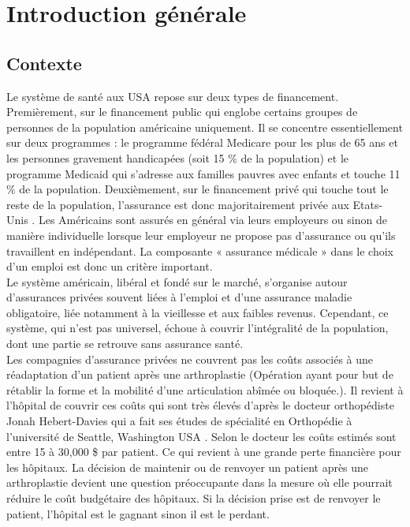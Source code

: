 \documentclass[12pt, french]{report}
\begin{document}
\newpage
\chapter{Introduction générale}	
\section{Contexte}
Le système de santé aux USA repose sur deux types de financement. Premièrement, sur le financement public qui englobe certains groupes de personnes de la population américaine uniquement. Il se concentre 	essentiellement sur deux programmes : le programme 		fédéral Medicare pour les plus de 65 ans et les personnes gravement handicapées (soit 15 \% de la population) et le programme Medicaid qui 			s’adresse aux familles pauvres avec enfants et touche 11 \% de la population. Deuxièmement, sur le financement privé qui touche tout le reste de la population, l’assurance est donc majoritairement privée aux 		Etats-Unis \cite{key4}. Les Américains sont assurés en général via leurs employeurs ou sinon de manière individuelle lorsque leur employeur ne propose pas d’assurance ou qu’ils travaillent en indépendant. La composante « 	assurance médicale » dans le choix d’un emploi est donc un critère important.\\
	
Le système américain, libéral et fondé sur le marché, s’organise autour d’assurances privées souvent liées à l’emploi et d’une assurance maladie obligatoire, liée notamment à la vieillesse et aux faibles revenus.
Cependant, ce système, qui n’est pas universel, échoue à couvrir l’intégralité de la population, dont une partie se retrouve sans assurance santé. \cite{key9} \\

Les compagnies d'assurance privées ne couvrent pas les coûts associés à une réadaptation d'un patient après une arthroplastie (Opération ayant pour but de rétablir la forme et la mobilité d'une articulation abîmée ou bloquée.). Il revient à l'hôpital de couvrir ces coûts qui sont très élevés d'après le docteur orthopédiste Jonah Hebert-Davies qui a fait ses études de spécialité en Orthopédie à l'université de Seattle, Washington USA \cite{key10}. Selon le docteur les coûts estimés sont entre 15 à 30,000 \$ par patient. Ce qui revient à une grande perte financière pour les hôpitaux.  La décision de maintenir ou de renvoyer un patient après une arthroplastie devient une question préoccupante dans la mesure où elle pourrait réduire le coût budgétaire des hôpitaux. Si la décision prise est de renvoyer le patient, l'hôpital est le gagnant sinon il est le perdant. \\ 
\end{document}
